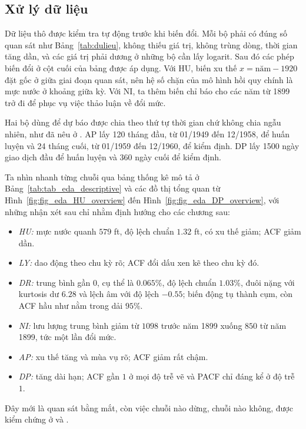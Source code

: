 \subsection{Xử lý dữ liệu}

Dữ liệu thô được kiểm tra tự động trước khi biến đổi. Mỗi bộ phải có đúng số quan sát như Bảng~\ref{tab:dulieu}, không thiếu giá trị, không trùng dòng, thời gian tăng dần, và các giá trị phải dương ở những bộ cần lấy logarit. Sau đó các phép biến đổi ở cột cuối của bảng được áp dụng. Với HU, biến xu thế $x=\text{năm}-1920$ đặt gốc ở giữa giai đoạn quan sát, nên hệ số chặn của mô hình hồi quy chính là mực nước ở khoảng giữa kỳ. Với NI, ta thêm biến chỉ báo cho các năm từ 1899 trở đi để phục vụ việc thảo luận về đổi mức.

Hai bộ dùng để dự báo được chia theo thứ tự thời gian chứ không chia ngẫu nhiên, như đã nêu ở . AP lấy 120 tháng đầu, từ 01/1949 đến 12/1958, để huấn luyện và 24 tháng cuối, từ 01/1959 đến 12/1960, để kiểm định. DP lấy 1500 ngày giao dịch đầu để huấn luyện và 360 ngày cuối để kiểm định.

Ta nhìn nhanh từng chuỗi qua bảng thống kê mô tả ở Bảng~\ref{tab:tab_eda_descriptive} và các đồ thị tổng quan từ Hình~\ref{fig:fig_eda_HU_overview} đến Hình~\ref{fig:fig_eda_DP_overview}, với những nhận xét sau chỉ nhằm định hướng cho các chương sau:
\begin{itemize}[leftmargin=*,itemsep=1pt]
\item \emph{HU:} mực nước quanh $579$ ft, độ lệch chuẩn $1.32$ ft, có xu thế giảm; ACF giảm dần.
\item \emph{LY:} dao động theo chu kỳ rõ; ACF đổi dấu xen kẽ theo chu kỳ đó.
\item \emph{DR:} trung bình gần $0$, cụ thể là $0.065\%$, độ lệch chuẩn $1.03\%$, đuôi nặng với kurtosis dư $6.28$ và lệch âm với độ lệch $-0.55$; biến động tụ thành cụm, còn ACF hầu như nằm trong dải $95\%$.
\item \emph{NI:} lưu lượng trung bình giảm từ $1098$ trước năm 1899 xuống $850$ từ năm 1899, tức một lần đổi mức.
\item \emph{AP:} xu thế tăng và mùa vụ rõ; ACF giảm rất chậm.
\item \emph{DP:} tăng dài hạn; ACF gần $1$ ở mọi độ trễ vẽ và PACF chỉ đáng kể ở độ trễ $1$.
\end{itemize}
Đây mới là quan sát bằng mắt, còn việc chuỗi nào dừng, chuỗi nào không, được kiểm chứng ở  và .

